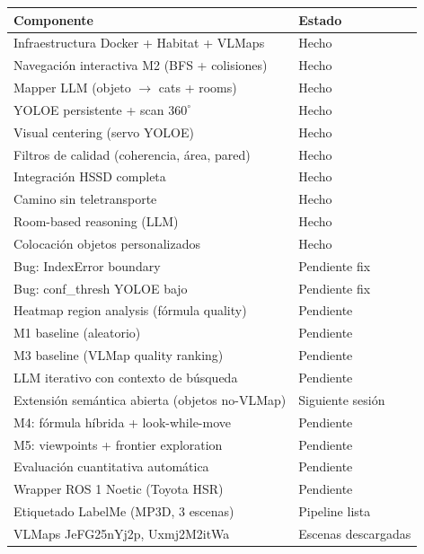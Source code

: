 \documentclass[11pt,a4paper]{article}
\begin{document}
\begin{center}
\begin{tabular}{ll}
\toprule
\textbf{Componente} & \textbf{Estado} \\
\midrule
Infraestructura Docker + Habitat + VLMaps & \textcolor{done}{Hecho} \\
Navegación interactiva M2 (BFS + colisiones) & \textcolor{done}{Hecho} \\
Mapper LLM (objeto $\rightarrow$ cats + rooms) & \textcolor{done}{Hecho} \\
YOLOE persistente + scan $360^\circ$ & \textcolor{done}{Hecho} \\
Visual centering (servo YOLOE) & \textcolor{done}{Hecho} \\
Filtros de calidad (coherencia, área, pared) & \textcolor{done}{Hecho} \\
Integración HSSD completa & \textcolor{done}{Hecho} \\
Camino sin teletransporte & \textcolor{done}{Hecho} \\
Room-based reasoning (LLM) & \textcolor{done}{Hecho} \\
Colocación objetos personalizados & \textcolor{done}{Hecho} \\
\midrule
Bug: IndexError boundary & \textcolor{bugcol}{Pendiente fix} \\
Bug: conf\_thresh YOLOE bajo & \textcolor{bugcol}{Pendiente fix} \\
\midrule
Heatmap region analysis (fórmula quality) & \textcolor{pendingcol}{Pendiente} \\
M1 baseline (aleatorio) & \textcolor{pendingcol}{Pendiente} \\
M3 baseline (VLMap quality ranking) & \textcolor{pendingcol}{Pendiente} \\
LLM iterativo con contexto de búsqueda & \textcolor{pendingcol}{Pendiente} \\
Extensión semántica abierta (objetos no-VLMap) & \textcolor{pendingcol}{Siguiente sesión} \\
M4: fórmula híbrida + look-while-move & \textcolor{pendingcol}{Pendiente} \\
M5: viewpoints + frontier exploration & \textcolor{pendingcol}{Pendiente} \\
Evaluación cuantitativa automática & \textcolor{pendingcol}{Pendiente} \\
Wrapper ROS 1 Noetic (Toyota HSR) & \textcolor{pendingcol}{Pendiente} \\
\midrule
Etiquetado LabelMe (MP3D, 3 escenas) & \textcolor{partialcol}{Pipeline lista} \\
VLMaps JeFG25nYj2p, Uxmj2M2itWa & \textcolor{partialcol}{Escenas descargadas} \\
\bottomrule
\end{tabular}
\end{center}
\end{document}
